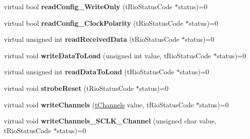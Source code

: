 \begin{DoxyCompactItemize}
\item 
\hypertarget{classnFPGA_1_1nFRC__2012__1__6__4_1_1tSPI_a209d54ae9c464884bf66febef5d64fe5}{
virtual bool {\bfseries readConfig\_\-WriteOnly} (tRioStatusCode $\ast$status)=0}
\label{classnFPGA_1_1nFRC__2012__1__6__4_1_1tSPI_a209d54ae9c464884bf66febef5d64fe5}

\item 
\hypertarget{classnFPGA_1_1nFRC__2012__1__6__4_1_1tSPI_a987db3e80ceec178023e5eb252cab4a2}{
virtual bool {\bfseries readConfig\_\-ClockPolarity} (tRioStatusCode $\ast$status)=0}
\label{classnFPGA_1_1nFRC__2012__1__6__4_1_1tSPI_a987db3e80ceec178023e5eb252cab4a2}

\item 
\hypertarget{classnFPGA_1_1nFRC__2012__1__6__4_1_1tSPI_a3029a218e28cb641303ad04e356a9efb}{
virtual unsigned int {\bfseries readReceivedData} (tRioStatusCode $\ast$status)=0}
\label{classnFPGA_1_1nFRC__2012__1__6__4_1_1tSPI_a3029a218e28cb641303ad04e356a9efb}

\item 
\hypertarget{classnFPGA_1_1nFRC__2012__1__6__4_1_1tSPI_a8b981ee7db49c28bb6ecb0ea34d1cc67}{
virtual void {\bfseries writeDataToLoad} (unsigned int value, tRioStatusCode $\ast$status)=0}
\label{classnFPGA_1_1nFRC__2012__1__6__4_1_1tSPI_a8b981ee7db49c28bb6ecb0ea34d1cc67}

\item 
\hypertarget{classnFPGA_1_1nFRC__2012__1__6__4_1_1tSPI_a6495e5cb6ed399f1e6f4ba7d16610988}{
virtual unsigned int {\bfseries readDataToLoad} (tRioStatusCode $\ast$status)=0}
\label{classnFPGA_1_1nFRC__2012__1__6__4_1_1tSPI_a6495e5cb6ed399f1e6f4ba7d16610988}

\item 
\hypertarget{classnFPGA_1_1nFRC__2012__1__6__4_1_1tSPI_a759b9b12b4feef0cba5435c2fcc2104f}{
virtual void {\bfseries strobeReset} (tRioStatusCode $\ast$status)=0}
\label{classnFPGA_1_1nFRC__2012__1__6__4_1_1tSPI_a759b9b12b4feef0cba5435c2fcc2104f}

\item 
\hypertarget{classnFPGA_1_1nFRC__2012__1__6__4_1_1tSPI_a12ac147040cdabc467ffd2f01dcf5773}{
virtual void {\bfseries writeChannels} (\hyperlink{unionnFPGA_1_1nFRC__2012__1__6__4_1_1tSPI_1_1tChannels}{tChannels} value, tRioStatusCode $\ast$status)=0}
\label{classnFPGA_1_1nFRC__2012__1__6__4_1_1tSPI_a12ac147040cdabc467ffd2f01dcf5773}

\item 
\hypertarget{classnFPGA_1_1nFRC__2012__1__6__4_1_1tSPI_a5872a62007246f225df4d2bbe28de9b8}{
virtual void {\bfseries writeChannels\_\-SCLK\_\-Channel} (unsigned char value, tRioStatusCode $\ast$status)=0}
\label{classnFPGA_1_1nFRC__2012__1__6__4_1_1tSPI_a5872a62007246f225df4d2bbe28de9b8}


\end{DoxyCompactItemize}
